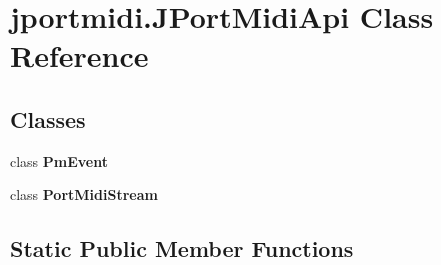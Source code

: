 \hypertarget{classjportmidi_1_1_j_port_midi_api}{}\section{jportmidi.\+J\+Port\+Midi\+Api Class Reference}
\label{classjportmidi_1_1_j_port_midi_api}
\subsection*{Classes}
\begin{DoxyCompactItemize}
\item 
class {\bfseries Pm\+Event}
\item 
class {\bfseries Port\+Midi\+Stream}
\end{DoxyCompactItemize}
\subsection*{Static Public Member Functions}
